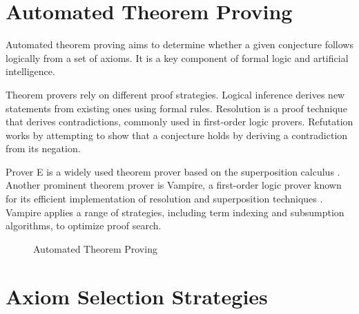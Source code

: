 \documentclass[english,version-2020-11]{uzl-thesis}
\begin{document}
\section{Automated Theorem Proving}

Automated theorem proving aims to determine whether a given conjecture follows logically from a set of axioms. It is a key component of formal logic and artificial intelligence.

Theorem provers rely on different proof strategies. Logical inference derives new statements from existing ones using formal rules. Resolution is a proof technique that derives contradictions, commonly used in first-order logic provers. Refutation works by attempting to show that a conjecture holds by deriving a contradiction from its negation.

Prover E is a widely used theorem prover based on the superposition calculus \cite{Schulz2019}. Another prominent theorem prover is Vampire, a first-order logic prover known for its efficient implementation of resolution and superposition techniques \cite{Riazanov2002}. Vampire applies a range of strategies, including term indexing and subsumption algorithms, to optimize proof search. 


\begin{figure}[ht]
    \caption {Automated Theorem Proving}
    \label{fig:automatedTheoremProving}
\end{figure}


\section{Axiom Selection Strategies}
\end{document}

